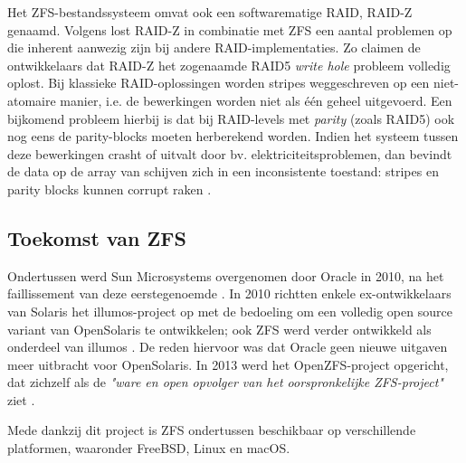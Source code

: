 Het ZFS-bestandssysteem omvat ook een softwarematige RAID, RAID-Z genaamd. Volgens \textcite{Bonwick2005} lost RAID-Z in combinatie met ZFS een aantal problemen op die inherent aanwezig zijn bij andere RAID-implementaties. Zo claimen de ontwikkelaars dat RAID-Z het zogenaamde RAID5 \textit{write hole} probleem volledig oplost. Bij klassieke RAID-oplossingen worden stripes weggeschreven op een niet-atomaire manier, i.e. de bewerkingen worden niet als één geheel uitgevoerd. Een bijkomend probleem hierbij is dat bij RAID-levels met \textit{parity} (zoals RAID5) ook nog eens de parity-blocks moeten herberekend worden. Indien het systeem tussen deze bewerkingen crasht of uitvalt door bv. elektriciteitsproblemen, dan bevindt de data op de array van schijven zich in een inconsistente toestand: stripes en parity blocks kunnen corrupt raken \autocite{Bonwick2005}. 


\subsection{Toekomst van ZFS}

Ondertussen werd Sun Microsystems overgenomen door Oracle in 2010, na het faillissement van deze eerstegenoemde \autocite{OracleOnbekend}. In 2010 richtten enkele ex-ontwikkelaars van Solaris het illumos-project op met de bedoeling om een volledig open source variant van OpenSolaris te ontwikkelen; ook ZFS werd verder ontwikkeld als onderdeel van illumos \autocite{illumos2012}. De reden hiervoor was dat Oracle geen nieuwe uitgaven meer uitbracht voor OpenSolaris. In 2013 werd het OpenZFS-project opgericht, dat zichzelf als de \textit{"ware en open opvolger van het oorspronkelijke ZFS-project"} ziet \autocite{OpenZFSHistory2014}.

Mede dankzij dit project is ZFS ondertussen beschikbaar op verschillende platformen, waaronder FreeBSD, Linux en macOS.



